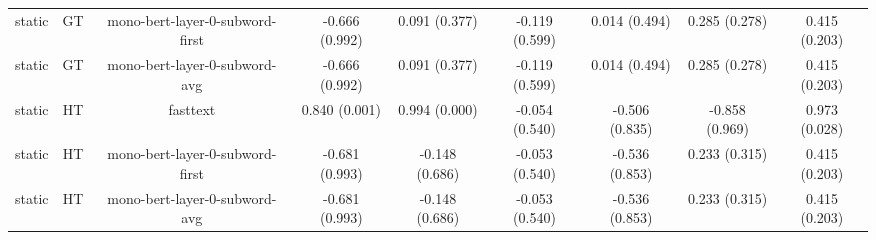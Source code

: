 \begin{sidewaystable}[htb]
\begin{tabular}{@{}ccccccccc@{}}
        static & GT & mono-bert-layer-0-subword-first & -0.666 (0.992) & 0.091 (0.377) & -0.119 (0.599) & 0.014 (0.494) & 0.285 (0.278) & 0.415 (0.203) \\
        static & GT & mono-bert-layer-0-subword-avg & -0.666 (0.992) & 0.091 (0.377) & -0.119 (0.599) & 0.014 (0.494) & 0.285 (0.278) & 0.415 (0.203) \\
        static & HT & fasttext & 0.840 (0.001) & 0.994 (0.000) & -0.054 (0.540) & -0.506 (0.835) & -0.858 (0.969) & 0.973 (0.028) \\
        static & HT & mono-bert-layer-0-subword-first & -0.681 (0.993) & -0.148 (0.686) & -0.053 (0.540) & -0.536 (0.853) & 0.233 (0.315) & 0.415 (0.203) \\
        static & HT & mono-bert-layer-0-subword-avg & -0.681 (0.993) & -0.148 (0.686) & -0.053 (0.540) & -0.536 (0.853) & 0.233 (0.315) & 0.415 (0.203) \\
        \bottomrule
    \end{tabular}
\end{sidewaystable}